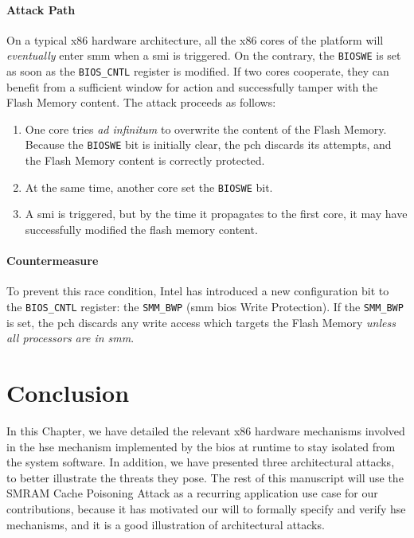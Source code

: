 \paragraph{Attack Path}
%
On a typical x86 hardware architecture, all the x86 cores of the platform will
\emph{eventually} enter \ac{smm} when a \ac{smi} is triggered.
%
On the contrary, the \texttt{BIOSWE} is set as soon as the \texttt{BIOS\_CNTL}
register is modified.
%
If two cores cooperate, they can benefit from a sufficient window for action and
successfully tamper with the Flash Memory content.
%
The attack proceeds as follows:

\begin{enumerate}
\item One core tries \emph{ad infinitum} to overwrite the content of the Flash
  Memory.
  Because the \texttt{BIOSWE} bit is initially clear, the \ac{pch} discards its
  attempts, and the Flash Memory content is correctly protected.
%
\item At the same time, another core set the \texttt{BIOSWE} bit.
%
\item A \ac{smi} is triggered, but by the time it propagates to the first core,
  it may have successfully modified the flash memory content.
%
\end{enumerate}

\paragraph{Countermeasure}
%
To prevent this race condition, Intel has introduced a new configuration bit to
the \texttt{BIOS\_CNTL} register: the \texttt{SMM\_BWP} (\ac{smm} \ac{bios}
Write Protection).
%
If the \texttt{SMM\_BWP} is set, the \ac{pch} discards any write access which
targets the Flash Memory \emph{unless all processors are in \ac{smm}}.

\section{Conclusion}
\label{sec:usecase:conclusion}

In this Chapter, we have detailed the relevant x86 hardware mechanisms involved
in the \ac{hse} mechanism implemented by the \ac{bios} at runtime to stay
isolated from the system software.
%
In addition, we have presented three architectural attacks, to better illustrate
the threats they pose.
%
The rest of this manuscript will use the SMRAM Cache Poisoning Attack as a
recurring application use case for our contributions, because it has motivated
our will to formally specify and verify \ac{hse} mechanisms, and it is a good
illustration of architectural attacks.
